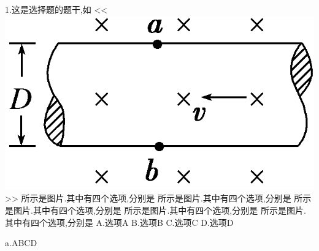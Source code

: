\documentclass[a4paper,fontset = windowsnew]{ctexbook}
\begin{document}
\begin{choices}
  1.这是选择题的题干,如
  <<
  \includegraphics{1.png}
  >>
  所示是图片.其中有四个选项,分别是
  所示是图片.其中有四个选项,分别是
  所示是图片.其中有四个选项,分别是
  所示是图片.其中有四个选项,分别是
  所示是图片.其中有四个选项,分别是
  A.选项A
  B.选项B
  C.选项C
  D.选项D

  a.ABCD


\end{choices}
\end{document}
